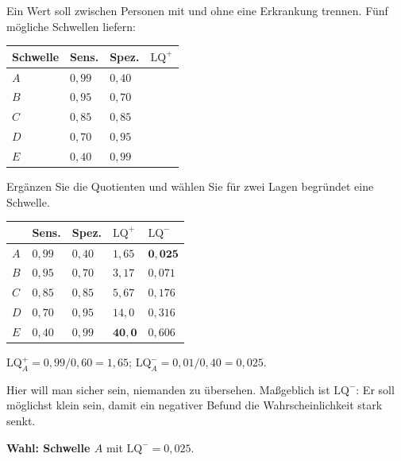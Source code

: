 \begin{aufgabe}
Ein Wert soll zwischen Personen mit und ohne eine Erkrankung trennen. Fünf mögliche Schwellen liefern:
\begin{center}
{\small
\renewcommand{\arraystretch}{1.4}
\begin{tabular}{@{}P{1.6cm}P{2.0cm}P{2.0cm}P{2.0cm}@{}}
\toprule
\textbf{Schwelle} & \textbf{Sens.} & \textbf{Spez.} & $\mathrm{LQ}^{+}$\\
\midrule
$A$ & $0{,}99$ & $0{,}40$ & \\
$B$ & $0{,}95$ & $0{,}70$ & \\
$C$ & $0{,}85$ & $0{,}85$ & \\
$D$ & $0{,}70$ & $0{,}95$ & \\
$E$ & $0{,}40$ & $0{,}99$ & \\
\bottomrule
\end{tabular}}
\end{center}
Ergänzen Sie die Quotienten und wählen Sie für zwei Lagen begründet eine Schwelle.

\loesung
{}
\begin{center}
{\small
\renewcommand{\arraystretch}{1.42}
\begin{tabular}{@{}P{1.4cm}P{1.8cm}P{1.8cm}P{1.8cm}P{1.6cm}@{}}
\toprule
& \textbf{Sens.} & \textbf{Spez.} & $\mathrm{LQ}^{+}$ & $\mathrm{LQ}^{-}$\\
\midrule
$A$ & $0{,}99$ & $0{,}40$ & $1{,}65$ & $\mathbf{0{,}025}$\\
$B$ & $0{,}95$ & $0{,}70$ & $3{,}17$ & $0{,}071$\\
$C$ & $0{,}85$ & $0{,}85$ & $5{,}67$ & $0{,}176$\\
$D$ & $0{,}70$ & $0{,}95$ & $14{,}0$ & $0{,}316$\\
$E$ & $0{,}40$ & $0{,}99$ & $\mathbf{40{,}0}$ & $0{,}606$\\
\bottomrule
\end{tabular}}
\end{center}

 $\mathrm{LQ}^{+}_A = 0{,}99/0{,}60 = 1{,}65$; $\mathrm{LQ}^{-}_A = 0{,}01/0{,}40 = 0{,}025$.

Hier will man sicher sein, niemanden zu übersehen. Maßgeblich ist $\mathrm{LQ}^{-}$: Er soll möglichst klein sein, damit ein negativer Befund die Wahrscheinlichkeit stark senkt.

\textbf{Wahl: Schwelle $A$} mit $\mathrm{LQ}^{-} = 0{,}025$.


\end{aufgabe}

